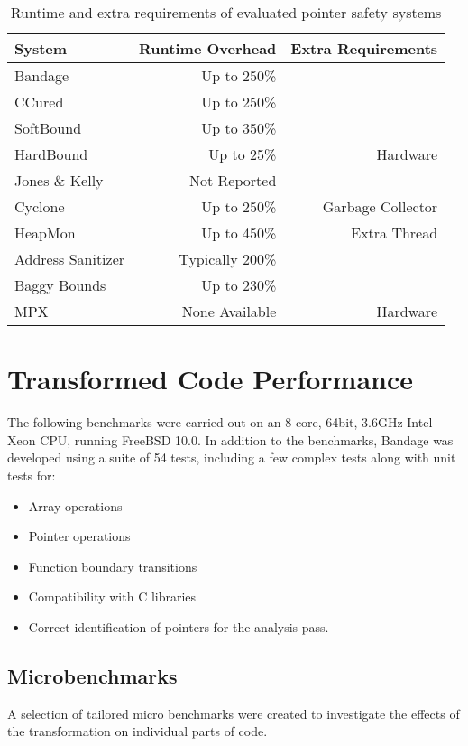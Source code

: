 \begin{table}
\centering
\begin{tabular}{l|r|r}
System & Runtime Overhead & Extra Requirements \\
\hline
Bandage             &Up to 250\%&\\
CCured              &Up to 250\%&\\
SoftBound           &Up to 350\%&\\
HardBound           &Up to 25\%&Hardware\\
Jones \& Kelly      &Not Reported&\\
Cyclone             &Up to 250\%&Garbage Collector\\
HeapMon             &Up to 450\%&Extra Thread\\
Address Sanitizer   &Typically 200\%&\\
Baggy Bounds        &Up to 230\%&\\
MPX                 &None Available&Hardware\\
\end{tabular}
\caption{Runtime and extra requirements of evaluated pointer safety systems}
\label{fig:Others}
\end{table}

\section{Transformed Code Performance}

The following benchmarks were carried out on an 8 core, 64bit, 3.6GHz Intel Xeon CPU, running FreeBSD 10.0.
In addition to the benchmarks, Bandage was developed using a suite of 54 tests, including a few complex tests along with unit tests for:

\begin{itemize}
\item Array operations
\item Pointer operations
\item Function boundary transitions
\item Compatibility with C libraries
\item Correct identification of pointers for the analysis pass.
\end{itemize}

\subsection{Microbenchmarks}

A selection of tailored micro benchmarks were created to investigate the effects of the transformation on individual parts of code.

